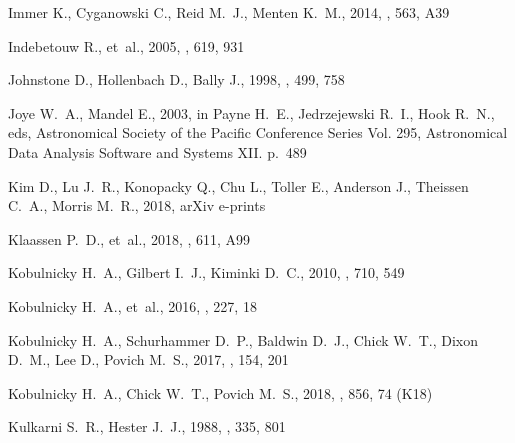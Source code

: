 \documentclass[useAMS, usenatbib, a4paper]{mnras}
\begin{document}
\begin{thebibliography}{}
{Immer} K.,  {Cyganowski} C.,  {Reid} M.~J.,   {Menten} K.~M.,  2014, \aap,
  563, A39

{Indebetouw} R.,  et~al., 2005, \apj, 619, 931

{Johnstone} D.,  {Hollenbach} D.,   {Bally} J.,  1998, \apj, 499, 758

{Joye} W.~A.,  {Mandel} E.,  2003, in {Payne} H.~E.,  {Jedrzejewski} R.~I.,
  {Hook} R.~N.,  eds,  Astronomical Society of the Pacific Conference Series
  Vol. 295, Astronomical Data Analysis Software and Systems XII. p.~489

{Kim} D.,  {Lu} J.~R.,  {Konopacky} Q.,  {Chu} L.,  {Toller} E.,  {Anderson}
  J.,  {Theissen} C.~A.,   {Morris} M.~R.,  2018, arXiv e-prints

{Klaassen} P.~D.,  et~al., 2018, \aap, 611, A99

{Kobulnicky} H.~A.,  {Gilbert} I.~J.,   {Kiminki} D.~C.,  2010, \apj, 710, 549

{Kobulnicky} H.~A.,  et~al., 2016, \apjs, 227, 18

{Kobulnicky} H.~A.,  {Schurhammer} D.~P.,  {Baldwin} D.~J.,  {Chick} W.~T.,
  {Dixon} D.~M.,  {Lee} D.,   {Povich} M.~S.,  2017, \aj, 154, 201

{Kobulnicky} H.~A.,  {Chick} W.~T.,   {Povich} M.~S.,  2018, \apj, 856, 74
  (K18)

{Kulkarni} S.~R.,  {Hester} J.~J.,  1988, \nat, 335, 801


\end{thebibliography}
\end{document}
